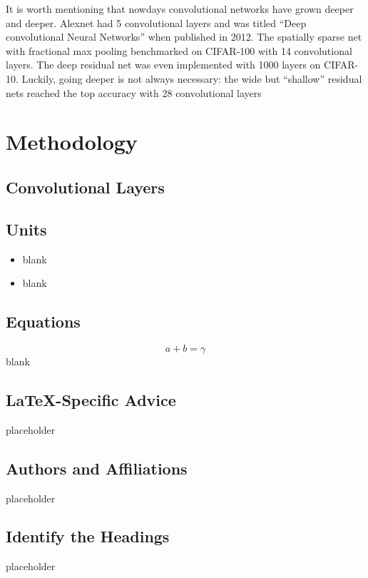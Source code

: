 \documentclass[conference]{IEEEtran}
\begin{document}
It is worth mentioning that nowdays convolutional networks have grown deeper and deeper. Alexnet had 5 convolutional layers and was titled ``Deep convolutional Neural Networks'' when published in 2012\cite{res}. The spatially sparse net with fractional max pooling benchmarked on CIFAR-100 with 14 convolutional layers\cite{fmp}. The deep residual net was even implemented with 1000 layers on CIFAR-10\cite{res}. Luckily, going deeper is not always necessary: the wide but ``shallow'' residual nets reached the top accuracy with 28 convolutional layers\cite{wide} 

\section{Methodology}
\subsection*{Convolutional Layers}


\subsection{Units}
\begin{itemize}
\item blank
\item blank
\end{itemize}

\subsection{Equations}
\begin{equation}
a+b=\gamma\label{eq}
\end{equation}
blank

\subsection{\LaTeX-Specific Advice}

placeholder


\subsection{Authors and Affiliations}
placeholder

\subsection{Identify the Headings}
placeholder
\end{document}
